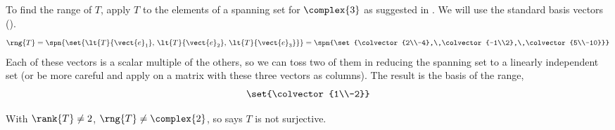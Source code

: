 To find the range of $T$, apply $T$ to the elements of a spanning set for $\complex{3}$ as suggested in .  We will use the standard basis vectors ().
%
\begin{equation*}
\rng{T}=
\spn{\set{\lt{T}{\vect{e}_1},\,\lt{T}{\vect{e}_2},\,\lt{T}{\vect{e}_3}}}=
\spn{\set{\colvector{2\\-4},\,\colvector{-1\\2},\,\colvector{5\\-10}}}
\end{equation*}
%
Each of these vectors is a scalar multiple of the others, so we can toss two of them in reducing the spanning set to a linearly independent set (or be more careful and apply  on a matrix with these three vectors as columns).  The result is the basis of the range,
%
\begin{equation*}
\set{\colvector{1\\-2}}
\end{equation*}
\par
%
With $\rank{T}\neq 2$, $\rng{T}\neq\complex{2}$, so  says $T$ is not surjective.
